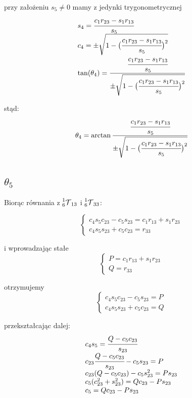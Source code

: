 \documentclass[]{article}
\newcommand\T{\mathcal{T}}
\begin{document}
przy założeniu $s_5 \neq 0$ mamy z jedynki trygonometrycznej
\begin{equation}\begin{array}{l}
s_4 = \cfrac{c_1r_{23} - s_1r_{13}}{s_5} \\
c_4 = \pm \sqrt{1 - \big(\cfrac{c_1r_{23} - s_1r_{13}}{s_5}\big)^2} \\
\tan(\theta_4) = \cfrac{\cfrac{c_1r_{23} - s_1r_{13}}{s_5}}{\pm \sqrt{1 - \big(\cfrac{c_1r_{23} - s_1r_{13}}{s_5}\big)^2}}
\end{array}\end{equation}

stąd:
\begin{equation}
\theta_4 = \arctan\cfrac{\cfrac{c_1r_{23} - s_1r_{13}}{s_5}}{\pm \sqrt{1 - \big(\cfrac{c_1r_{23} - s_1r_{13}}{s_5}\big)^2}}
\end{equation}

\subsection{$\theta_5$}
Biorąc równania z $\prescript{1}{6}{\T}_{13}$ i $\prescript{1}{6}{\T}_{33}$:

\begin{equation}\left\{\begin{array}{l}
c_4s_5c_{23} - c_5s_{23} = c_1r_{13} + s_1r_{23} \\
c_4s_5s_{23} + c_5c_{23} = r_{33}
\end{array}\right.\end{equation}

i wprowadzając stałe
\begin{equation}\left\{\begin{array}{l}
P = c_1r_{13} + s_1r_{23} \\
Q = r_{33}
\end{array}\right.\end{equation}

otrzymujemy
\begin{equation}\left\{\begin{array}{l}
c_4s_5c_{23} - c_5s_{23} = P \\
c_4s_5s_{23} + c_5c_{23} = Q
\end{array}\right.\end{equation}

przekształcając dalej:
\begin{equation}\begin{array}{l}
c_4s_5 = \cfrac{Q - c_5c_{23}}{s_{23}} \\
c_{23}\cfrac{Q - c_5c_{23}}{s_{23}} - c_5s_{23} = P \\
c_{23}(Q - c_5c_{23}) - c_5s_{23}^2 = Ps_{23} \\
c_5(c_{23}^2 + s_{23}^2) = Qc_{23} - Ps_{23} \\
c_5 = Qc_{23} - Ps_{23}
\end{array}\end{equation}
\end{document}
